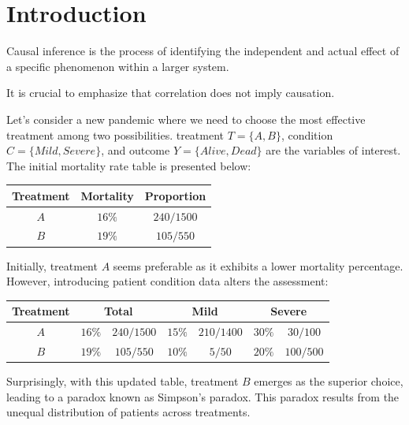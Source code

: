 \section{Introduction}

\begin{definition}
    Causal inference is the process of identifying the independent and actual effect of a specific phenomenon within a larger system.
\end{definition}

It is crucial to emphasize that correlation does not imply causation.
\begin{example}
    Let's consider a new pandemic where we need to choose the most effective treatment among two possibilities.
    treatment $T=\{A,B\}$, condition $C=\{Mild,Severe\}$, and outcome $Y=\{Alive, Dead\}$ are the variables of interest. 
    The initial mortality rate table is presented below:
    \begin{table}[H]
        \centering
        \begin{tabular}{ccc}
        \hline
        \textbf{Treatment} & \textbf{Mortality} & \textbf{Proportion} \\ \hline
        $A$                & $16\%$             & $240/1500$  \\
        $B$                & $19\%$             & $105/550$   \\ \hline
        \end{tabular}
    \end{table}
    Initially, treatment $A$ seems preferable as it exhibits a lower mortality percentage.
    However, introducing patient condition data alters the assessment:
    \begin{table}[H]
        \centering
        \begin{tabular}{|c|cc|cccc|}
        \hline
        \textbf{Treatment} & \multicolumn{2}{c|}{\textbf{Total}} & \multicolumn{2}{c}{\textbf{Mild}} & \multicolumn{2}{c|}{\textbf{Severe}} \\ \hline
        $A$                & $16\%$         & $240/1500$         & $15\%$        & $210/1400$        & $30\%$          & $30/100$           \\
        $B$                & $19\%$         & $105/550$          & $10\%$        & $5/50$            & $20\%$          & $100/500$          \\ \hline
        \end{tabular}
    \end{table}
    Surprisingly, with this updated table, treatment $B$ emerges as the superior choice, leading to a paradox known as Simpson's paradox.
    This paradox results from the unequal distribution of patients across treatments.


\end{example}
